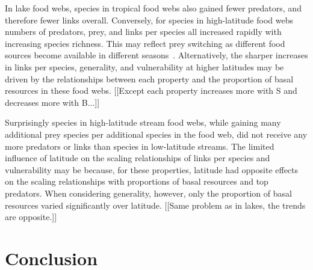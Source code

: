 \documentclass[12pt]{article}
\begin{document}
In lake food webs, species in tropical food webs also gained fewer predators,
and therefore fewer links overall. Conversely, for species in high-latitude
food webs numbers of predators, prey, and links per species all increased
rapidly with increasing species richness. This may reflect prey switching as
different food sources become available in different seasons~\citep{}.
Alternatively, the sharper increases in links per species, generality, and
vulnerability at higher latitudes may be driven by the relationships between
each property and the proportion of basal resources in these food webs.
[[Except each property increases more with S and decreases more with B...]]


Surprisingly species in high-latitude stream food webs, while gaining many
additional prey species per additional species in the food web, did not
receive any more predators or links than species in low-latitude streams. The
limited influence of latitude on the scaling relationships of links per
species and vulnerability may be because, for these properties, latitude had
opposite effects on the scaling relationships with proportions of basal
resources and top predators. When considering generality, however, only the
proportion of basal resources varied significantly over latitude. [[Same
problem as in lakes, the trends are opposite.]]


\section*{Conclusion}



\newpage

\newpage


\end{document}
